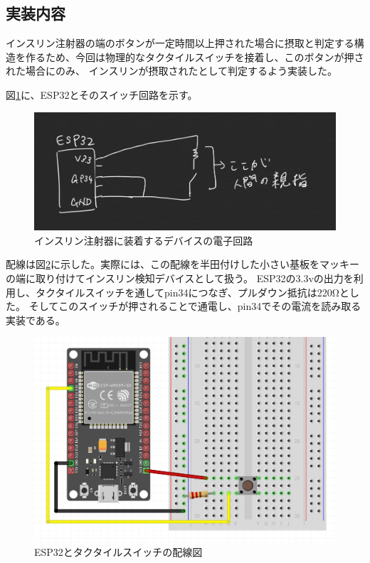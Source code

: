 \subsection{実装内容}

インスリン注射器の端のボタンが一定時間以上押された場合に摂取と判定する構造を作るため、今回は物理的なタクタイルスイッチを接着し、このボタンが押された場合にのみ、
インスリンが摂取されたとして判定するよう実装した。

図\ref{fig:insulin_pen_device_circuit}に、ESP32とそのスイッチ回路を示す。

\begin{figure}[htbp]
  \caption{インスリン注射器に装着するデバイスの電子回路}
  \label{fig:insulin_pen_device_circuit}
  \begin{center}
    \includegraphics[bb=0 0 1000 300,width=20cm]{assets/insulin_pen_device_circuit.png}
  \end{center}
\end{figure}

配線は図\ref{fig:esp32_switch}に示した。実際には、この配線を半田付けした小さい基板をマッキーの端に取り付けてインスリン検知デバイスとして扱う。
ESP32の3.3vの出力を利用し、タクタイルスイッチを通してpin34につなぎ、プルダウン抵抗は220Ωとした。
そしてこのスイッチが押されることで通電し、pin34でその電流を読み取る実装である。

\begin{figure}[htbp]
  \caption{ESP32とタクタイルスイッチの配線図}
  \label{fig:esp32_switch}
  \begin{center}
    \includegraphics[bb=0 0 1000 550,width=17cm]{assets/esp32_switch.png}
  \end{center}
\end{figure}


